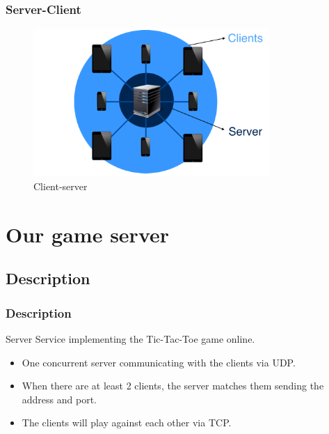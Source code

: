 \documentclass{beamer}
\begin{document}
\begin{frame}
	\frametitle{Server-Client}
	\begin{figure}[H]
    	\centering
     \includegraphics[width=0.8\textwidth]{clientserver.png}
     \caption{Client-server}
     \end{figure}
\end{frame}

\section{Our game server}
\subsection{Description}
\begin{frame}
	\frametitle{Description}
	\begin{block}{Server}
		Service implementing the Tic-Tac-Toe game online.
	\end{block}
	\begin{itemize}
		\item One concurrent server communicating with the clients via UDP.
		\item When there are at least 2 clients, the server matches them sending the address and port.
		\item The clients will play against each other via TCP.
	\end{itemize}
\end{frame}
\end{document}
